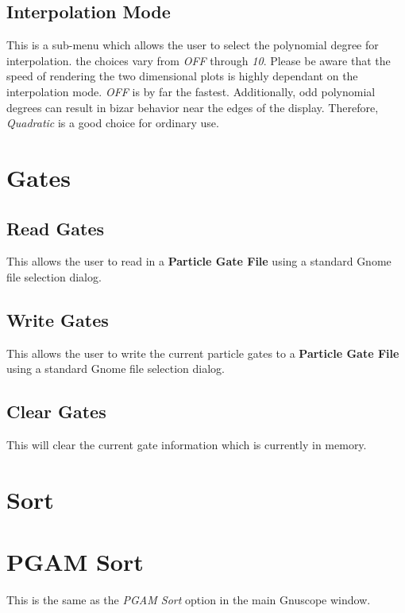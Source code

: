 \subsection{Interpolation Mode}

This is a sub-menu which allows the user to select the polynomial degree for interpolation.  the choices vary from {\it OFF} through {\it 10}.  Please be aware that the speed of rendering the two dimensional plots is highly dependant on the interpolation mode.  {\it OFF} is by far the fastest.  Additionally, odd polynomial degrees can result in bizar behavior near the edges of the display.  Therefore,  {\it Quadratic} is a good choice for ordinary use.

\section{Gates}

\subsection{Read Gates}

This allows the user to read in a {\bf Particle Gate File} using a standard Gnome file selection dialog.

\subsection{Write Gates}

This allows the user to write the current particle gates to a {\bf Particle Gate File} using a standard Gnome file selection dialog.

\subsection{Clear Gates}

This will clear the current gate information which is currently in memory.

\section{Sort}

\section{PGAM Sort}

This is the same as the {\it PGAM Sort} option in the main Gnuscope window.

